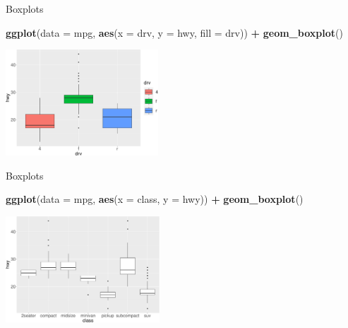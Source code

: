 \documentclass[ignorenonframetext,]{beamer}
\newenvironment{Shaded}{\begin{snugshade}}{\end{snugshade}}
\newcommand{\DataTypeTok}[1]{\textcolor[rgb]{0.13,0.29,0.53}{#1}}
\newcommand{\KeywordTok}[1]{\textcolor[rgb]{0.13,0.29,0.53}{\textbf{#1}}}
\newcommand{\NormalTok}[1]{#1}
\newcommand{\OperatorTok}[1]{\textcolor[rgb]{0.81,0.36,0.00}{\textbf{#1}}}
\newcommand{\StringTok}[1]{\textcolor[rgb]{0.31,0.60,0.02}{#1}}
\begin{document}
\begin{frame}[fragile]{Boxplots}
\protect\hypertarget{boxplots-3}{}

\begin{Shaded}
\begin{Highlighting}[]
\KeywordTok{ggplot}\NormalTok{(}\DataTypeTok{data =}\NormalTok{ mpg, }
       \KeywordTok{aes}\NormalTok{(}\DataTypeTok{x =}\NormalTok{ drv, }\DataTypeTok{y =}\NormalTok{ hwy, }\DataTypeTok{fill =}\NormalTok{ drv)) }\OperatorTok{+}\StringTok{ }
\StringTok{  }\KeywordTok{geom_boxplot}\NormalTok{()}
\end{Highlighting}
\end{Shaded}

\begin{center}\includegraphics[height=150px]{data-visualization_files/figure-beamer/unnamed-chunk-139-1} \end{center}

\end{frame}

\begin{frame}[fragile]{Boxplots}
\protect\hypertarget{boxplots-4}{}

\begin{Shaded}
\begin{Highlighting}[]
\KeywordTok{ggplot}\NormalTok{(}\DataTypeTok{data =}\NormalTok{ mpg, }\KeywordTok{aes}\NormalTok{(}\DataTypeTok{x =}\NormalTok{ class, }\DataTypeTok{y =}\NormalTok{ hwy)) }\OperatorTok{+}\StringTok{ }
\StringTok{  }\KeywordTok{geom_boxplot}\NormalTok{()}
\end{Highlighting}
\end{Shaded}

\begin{center}\includegraphics[height=150px]{data-visualization_files/figure-beamer/unnamed-chunk-140-1} \end{center}

\end{frame}
\end{document}
